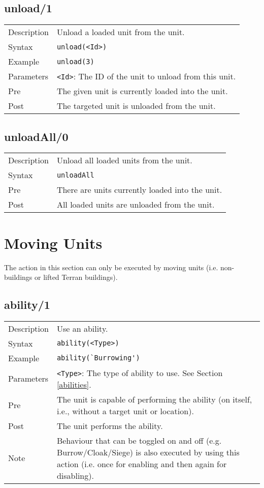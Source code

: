 \subsection{unload/1}
\begin{tabularx}{\textwidth}{lX}
 Description & Unload a loaded unit from the unit. \\
 Syntax & \verb|unload(<Id>)| \\
 Example & \verb|unload(3)| \\
 Parameters & \verb|<Id>|: The ID of the unit to unload from this unit.\\
 Pre & The given unit is currently loaded into the unit. \\
 Post & The targeted unit is unloaded from the unit.
\end{tabularx}

\subsection{unloadAll/0}
\begin{tabularx}{\textwidth}{lX}
 Description & Unload all loaded units from the unit. \\
 Syntax & \verb|unloadAll| \\
 Pre & There are units currently loaded into the unit. \\
 Post & All loaded units are unloaded from the unit.
\end{tabularx}

\pagebreak

\section{Moving Units}
The action in this section can only be executed by moving units (i.e. non-buildings or lifted Terran buildings).

\subsection{ability/1}
\begin{tabularx}{\textwidth}{lX}
 Description & Use an ability. \\
 Syntax & \verb|ability(<Type>)| \\
 Example & \verb|ability(`Burrowing')| \\
 Parameters & \verb|<Type>|: The type of ability to use. See Section \ref{abilities}. \\
 Pre & The unit is capable of performing the ability (on itself, i.e., without a target unit or location). \\
 Post & The unit performs the ability. \\
 Note & Behaviour that can be toggled on and off (e.g. Burrow/Cloak/Siege) is also executed by using this action (i.e. once for enabling and then again for disabling).
\end{tabularx}

